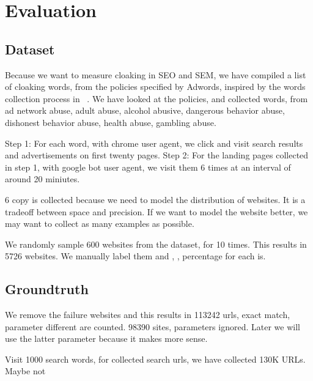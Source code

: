 \section{Evaluation}
\label{s:evaluation}



\subsection{Dataset}


Because we want to measure cloaking in SEO and SEM, we have compiled a list of
cloaking words, from the policies specified by Adwords, inspired by the words
collection process in ~\cite{wang2011cloak}. We have looked at the policies, and
collected  words, from ad network abuse, adult abuse, alcohol abusive, dangerous behavior
abuse, dishonest behavior abuse, health abuse, gambling abuse.

Step 1: For each word, with chrome user agent, we click and visit search results and advertisements on first
twenty pages.
Step 2: For the landing pages collected in step 1, with google bot user agent, we visit them 6 times at an
interval of around 20 miniutes.

6 copy is collected because we need to model the distribution of websites. It is
a tradeoff between space and precision. If we want to model the website better,
we may want to collect as many examples as possible.


We randomly sample 600 websites from the dataset, for 10 times. This results in
5726 websites. We manually label them and , , percentage
for each is.


\subsection{Groundtruth}

We remove the failure websites and this results in 
113242 urls, exact match, parameter different are counted.
98390 sites, parameters ignored. Later we will use the latter parameter because
it makes more sense.


Visit 1000 search words, for collected search urls, we have collected
130K URLs.
Maybe not

%
%
%
%

